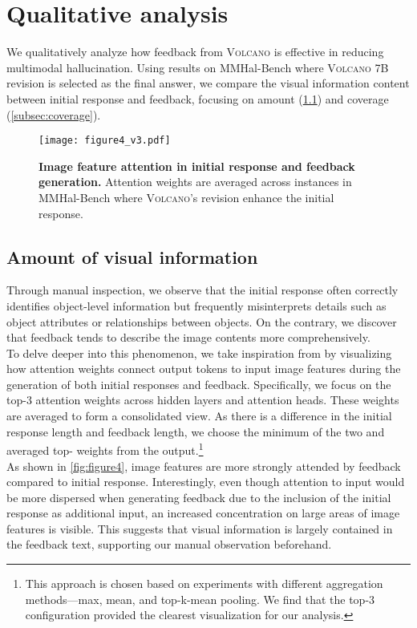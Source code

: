 \documentclass[11pt]{article}
\newcommand{\Ours}{\textsc{Volcano}}
\begin{document}
\section{Qualitative analysis}
\label{sec:qualitative}
We qualitatively analyze how feedback from {\Ours} is effective in reducing multimodal hallucination. Using results on MMHal-Bench where {\Ours} 7B revision is selected as the final answer, we compare the visual information content between initial response and feedback, focusing on amount (\ref{subsec:amount}) and coverage (\ref{subsec:coverage}). 
\begin{figure}[ht]
    \centering
    \texttt{[image: figure4\_v3.pdf]}
    \caption{\textbf{Image feature attention in initial response and feedback generation.} Attention weights are averaged across instances in MMHal-Bench where {\Ours}'s revision enhance the initial response.}
    \label{fig:figure4}
\end{figure}
\subsection{Amount of visual information}
\label{subsec:amount}
Through manual inspection, we observe that the initial response often correctly identifies object-level information but frequently misinterprets details such as object attributes or relationships between objects. On the contrary, we discover that feedback tends to describe the image contents more comprehensively. \\
To delve deeper into this phenomenon, we take inspiration from \citet{wang2023evaluation} by visualizing how attention weights connect output tokens to input image features during the generation of both initial responses and feedback. Specifically, we focus on the top-3 attention weights across hidden layers and attention heads. These weights are averaged to form a consolidated view. As there is a difference in the initial response length and feedback length, we choose the minimum  of the two and averaged top- weights from the output.\footnote{This approach is chosen based on experiments with different aggregation methods---max, mean, and top-k-mean pooling. We find that the top-3 configuration provided the clearest visualization for our analysis.} \\
As shown in \autoref{fig:figure4}, image features are more strongly attended by feedback compared to initial response. Interestingly, even though attention to input would be more dispersed when generating feedback due to the inclusion of the initial response as additional input, an increased concentration on large areas of image features is visible. This suggests that visual information is largely contained in the feedback text, supporting our manual observation beforehand.
\end{document}
